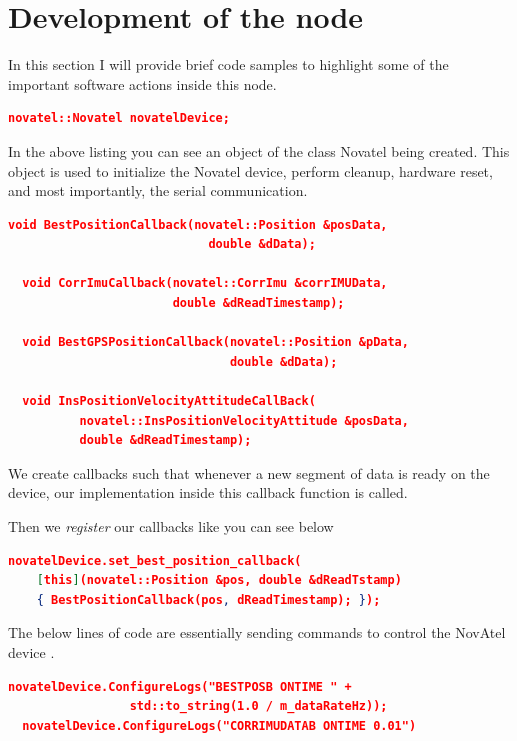\documentclass[a4paper, 12pt, oneside]{report}
\begin{document}
  \section{Development of the node}
  In this section I will provide brief code samples to highlight some of the important software actions inside this node. 
  
  \begin{lstlisting}[language=json,firstnumber=1]
  novatel::Novatel novatelDevice;
  \end{lstlisting}
  
  In the above listing you can see an object of the class Novatel being created. This object is used to initialize the Novatel device, perform cleanup, hardware reset, and most importantly, the serial communication.  
    
  \begin{lstlisting}[language=json,firstnumber=1]
  void BestPositionCallback(novatel::Position &posData, 
                            double &dData);
  
  void CorrImuCallback(novatel::CorrImu &corrIMUData, 
                       double &dReadTimestamp);
  
  void BestGPSPositionCallback(novatel::Position &pData, 
                               double &dData);
  
  void InsPositionVelocityAttitudeCallBack(
          novatel::InsPositionVelocityAttitude &posData, 
          double &dReadTimestamp);
  \end{lstlisting}
  
  We create callbacks such that whenever a new segment of data is ready on the device, our implementation inside this callback function is called.
  
  Then we \textit{register} our callbacks like you can see below
  
  \begin{lstlisting}[language=json,firstnumber=1]
  novatelDevice.set_best_position_callback(
    [this](novatel::Position &pos, double &dReadTstamp) 
    { BestPositionCallback(pos, dReadTimestamp); });
  \end{lstlisting}
  
  The below lines of code are essentially sending commands to control the NovAtel device \cite{-2020-01-31}.

  \begin{lstlisting}[language=json,firstnumber=1]
  novatelDevice.ConfigureLogs("BESTPOSB ONTIME " + 
                 std::to_string(1.0 / m_dataRateHz));
  novatelDevice.ConfigureLogs("CORRIMUDATAB ONTIME 0.01")
  
  \end{lstlisting}
  
\end{document}
